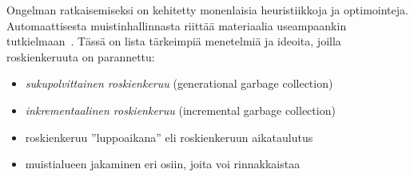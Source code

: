 Ongelman ratkaisemiseksi on kehitetty monenlaisia heuristiikkoja ja optimointeja. Automaattisesta muistinhallinnasta riittää materiaalia useampaankin tutkielmaan~\cite{gcbib}. Tässä on lista tärkeimpiä menetelmiä ja ideoita, joilla roskienkeruuta on parannettu:


\begin{itemize}
\item \textit{sukupolvittainen roskienkeruu} (generational garbage collection)~\cite{v8design}
\item \textit{inkrementaalinen roskienkeruu} (incremental garbage collection)~\cite{incrementalgc}
\item roskienkeruu ''luppoaikana'' eli roskienkeruun aikataulutus~\cite{freegc}
\item muistialueen jakaminen eri osiin, joita voi rinnakkaistaa~\cite{ie10}
\end{itemize}



